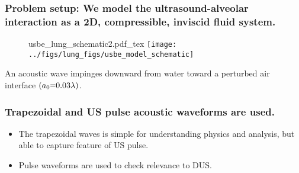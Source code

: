 \begin{frame}
\begin{minipage}{\textwidth}
\begin{minipage}{0.5\textwidth}
\begin{figure}
%
      \end{figure}
    \end{minipage}
  \end{minipage}
\end{frame}
\begin{frame} \frametitle{Problem setup: We model the ultrasound-alveolar interaction as a 2D, compressible, inviscid fluid system.}
  \begin{figure}
    \centering
    \def\svgwidth{0.48\textwidth}
    {\footnotesize
      {usbe_lung_schematic2.pdf_tex} \hfill%
    }
    \texttt{[image: ../figs/lung\_figs/usbe\_model\_schematic]} \hfill
  \end{figure}
  An acoustic wave impinges downward from water toward a perturbed air interface $(a_0\equals0.03\lambda)$.
\end{frame}
\begin{frame} \frametitle{Trapezoidal and US pulse acoustic waveforms are used.}
  \begin{figure}
    \centering
    \hfill%
  \end{figure}
  \begin{itemize}
  \item The trapezoidal waves is simple for understanding physics and analysis, but able to capture feature of US pulse.
  \item Pulse waveforms are used to check relevance to DUS.
  \end{itemize}
\end{frame}
